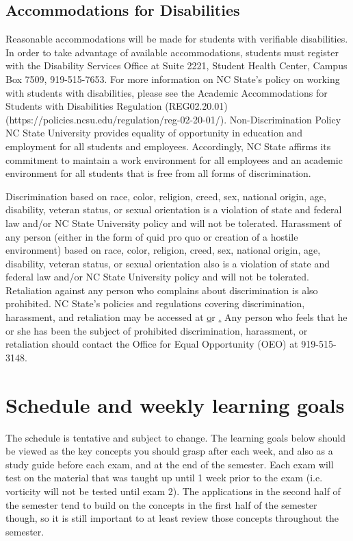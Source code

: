 \documentclass[11pt]{article}
\begin{document}
\subsection*{Accommodations for Disabilities}
\footnotesize{Reasonable accommodations will be made for students with verifiable disabilities. In order to take advantage of available accommodations, students must register with the Disability Services Office at Suite 2221, Student Health Center, Campus Box 7509, 919-515-7653. For more information on NC State's policy on working with students with disabilities, please see the Academic Accommodations for Students with Disabilities Regulation (REG02.20.01) (https://policies.ncsu.edu/regulation/reg-02-20-01/).
Non-Discrimination Policy NC State University provides equality of opportunity in education and employment for all students and employees. Accordingly, NC State affirms its commitment to maintain a work environment for all employees and an academic environment for all students that is free from all forms of discrimination.}

\footnotesize{Discrimination based on race, color, religion, creed, sex, national origin, age, disability, veteran status, or sexual orientation is a violation of state and federal law and/or NC State University policy and will not be tolerated. Harassment of any person (either in the form of quid pro quo or creation of a hostile environment) based on race, color, religion, creed, sex, national origin, age, disability, veteran status, or sexual orientation also is a violation of state and federal law and/or NC State University policy and will not be tolerated. Retaliation against any person who complains about discrimination is also prohibited. NC State's policies and regulations covering discrimination, harassment, and retaliation may be accessed at \href{http://policies.ncsu.edu/policy/pol-04-25-05} or  \href{http://www.ncsu.edu/equal_op/}. Any person who feels that he or she has been the subject of prohibited discrimination, harassment, or retaliation should contact the Office for Equal Opportunity (OEO) at 919-515-3148.}


\newpage
\section*{Schedule and weekly learning goals}

The schedule is tentative and subject to change. The learning goals below should be viewed as the key concepts you should grasp after each week, and also as a study guide before each exam, and at the end of the semester. Each exam will test on the material that was taught up until 1 week prior to the exam (i.e. vorticity will not be tested until exam 2). The applications in the second half of the semester tend to build on the concepts in the first half of the semester though, so it is still important to at least review those concepts throughout the semester.
\end{document}

